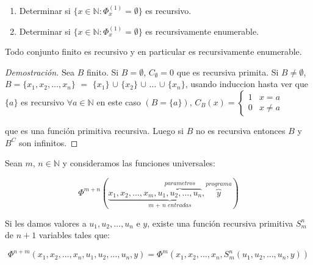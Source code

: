 \begin{example}

\begin{enumerate}
	\item Determinar si $\{ x \in \mathbb{N} \colon \Phi^{(1)}_{x} = \emptyset \}$ es recursivo.
	\item Determinar si $\{ x \in \mathbb{N} \colon \Phi^{(1)}_{x} = \emptyset \}$ es recursivamente enumerable.
\end{enumerate}
\end{example}

\begin{observation}
Todo conjunto finito es recursivo y en particular es recursivamente enumerable.
\end{observation}

\begin{proof}[Demostraci\'on]
Sea $B$ finito. Si $B = \emptyset$, $C_{\emptyset} = 0$ que es recursiva primita. Si $B \neq \emptyset$, $B = \{ x_1, x_2, \ldots, x_n \}$ $=$  $\{ x_1 \}$ $\cup$ $\{ x_2 \}$ $\cup$ $\ldots$  $\cup$ $\{ x_n \}$, usando induccion hasta ver que $\{ a \}$ es recursivo $\forall a \in \mathbb{N}$ en este caso $(B = \{ a \})$,
$C_B(x) =
\begin{cases}
1		&x = a		\\
0		&x \neq a	
\end{cases}$

que es una funci\'on primitiva recursiva. Luego si $B$ no es recursiva entonces $B$ y $B^{C}$ son infinitos.
\end{proof}

\begin{definition}
Sean $m$, $n \in \mathbb{N}$ y consideramos las funciones universales:

\[
\Phi^{m + n}(\underbrace{x_1, x_2, \ldots, x_m, \overbrace{u_1, u_2, \ldots, u_n}^{parametros}, \overbrace{y}^{programa}}_{\textit{m + n entradas}})
\]

Si les damos valores a $u_1, u_2, \ldots, u_n$ e $y$, existe una funci\'on recursiva primitiva $S^{n}_{m}$ de $n + 1$ variables tales que:

\[
\Phi^{n + m}(x_1, x_2, \ldots, x_n, u_1, u_2, \ldots, u_n, y) = \Phi^{m}(x_1, x_2, \ldots, x_n, S^{n}_{m}(u_1, u_2, \ldots, u_n, y))
\]

\end{definition}

